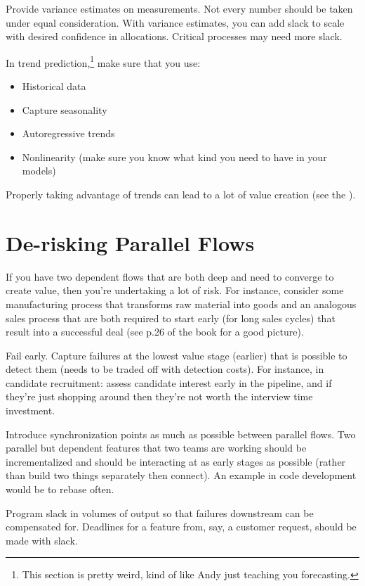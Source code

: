 \documentclass{article}
\begin{document}
Provide variance estimates on measurements. Not every number should be taken under equal consideration. With variance estimates, you can add slack to scale with desired confidence in allocations. Critical processes may need more slack.

In trend prediction,\footnote{This section is pretty weird, kind of like Andy just teaching you forecasting.} make sure that you use:
\begin{itemize}
\item Historical data
\item Capture seasonality
\item Autoregressive trends
\item Nonlinearity (make sure you know what kind you need to have in your models)
\end{itemize}

Properly taking advantage of trends can lead to a lot of value creation (see the ).

\section{De-risking Parallel Flows}

If you have two dependent flows that are both deep and need to converge to create value, then you're undertaking a lot of risk. For instance, consider some manufacturing process that transforms raw material into goods and an analogous sales process that are both required to start early (for long sales cycles) that result into a successful deal (see p.26 of the book for a good picture).

Fail early. Capture failures at the lowest value stage (earlier) that is possible to detect them (needs to be traded off with detection costs). For instance, in candidate recruitment: assess candidate interest early in the pipeline, and if they’re just shopping around then they’re not worth the interview time investment.

Introduce synchronization points as much as possible between parallel flows. Two parallel but dependent features that two teams are working should be incrementalized and should be interacting at as early stages as possible (rather than build two things separately then connect). An example in code development would be to rebase often.

Program slack in volumes of output so that failures downstream can be compensated for. Deadlines for a feature from, say, a customer request, should be made with slack.
\end{document}
